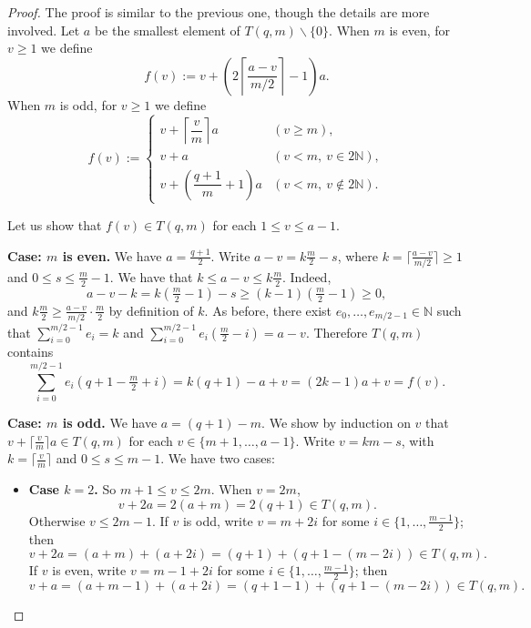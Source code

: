 \documentclass[12pt]{amsart}
\theoremstyle{remark}
\theoremstyle{definition}
\newcommand{\coloneqq}{\mathrel{:=}}
\begin{document}
\begin{proof}
    The proof is similar to the previous one, though the details are more
    involved. Let $a$ be the smallest element of $T(q,m) \smallsetminus \{0\}$.
    When $m$ is even, for $v \ge 1$ we define
    $$f(v) \coloneqq v + \left(2\left\lceil\frac{a-v}{m/2}\right\rceil - 1\right)a.$$
    When $m$ is odd, for $v \ge 1$ we define
    \[
    f(v) \coloneqq \begin{cases}
        v + \left\lceil\dfrac{v}{m}\right\rceil a
            & \left(v \ge m\right), \\[6pt]
        v + a
            & \left(v < m,\ v \in 2\mathbb{N}\right), \\[6pt]
        v + \left(\dfrac{q+1}{m}+1\right)a
            & \left(v < m,\ v \notin 2\mathbb{N}\right).
    \end{cases}
    \]

    Let us show that $f(v) \in T(q,m)$ for each $1 \le v \le a-1$.

    \medskip
    \noindent\textbf{Case: $m$ is even.}
    We have $a = \frac{q+1}{2}$. Write $a - v = k\frac{m}{2} - s$, where
    $k = \lceil\frac{a-v}{m/2}\rceil \ge 1$ and $0 \le s \le \frac{m}{2}-1$.
    We have that $k \le a-v \le k\frac{m}{2}$. Indeed,
    $$a - v - k = k\left(\tfrac{m}{2}-1\right) - s \ge (k-1)\left(\tfrac{m}{2}-1\right) \ge 0,$$
    and $k\frac{m}{2} \ge \frac{a-v}{m/2}\cdot\frac{m}{2}$ by definition of $k$.
    As before, there exist $e_0, \ldots, e_{m/2-1} \in \mathbb{N}$ such that
    $\sum_{i=0}^{m/2-1} e_i = k$ and
    $\sum_{i=0}^{m/2-1} e_i\!\left(\frac{m}{2}-i\right) = a-v$.
    Therefore $T(q,m)$ contains
    $$\sum_{i=0}^{m/2-1} e_i\!\left(q+1-\tfrac{m}{2}+i\right)
      = k(q+1) - a + v = (2k-1)a + v = f(v).$$

    \medskip
    \noindent\textbf{Case: $m$ is odd.}
    We have $a = (q+1)-m$. We show by induction on $v$ that
    $v + \lceil\frac{v}{m}\rceil a \in T(q,m)$ for each
    $v \in \{m+1, \ldots, a-1\}$.
    Write $v = km - s$, with $k = \lceil\frac{v}{m}\rceil$ and $0 \le s \le m-1$.
    We have two cases:

    \begin{itemize}
        \item \textbf{Case $k = 2$.} So $m+1 \le v \le 2m$.
        When $v = 2m$,
        $$v + 2a = 2(a+m) = 2(q+1) \in T(q,m).$$
        Otherwise $v \le 2m-1$.
        If $v$ is odd, write $v = m + 2i$ for some
        $i \in \{1,\ldots,\frac{m-1}{2}\}$; then
        $$v + 2a = (a+m) + (a+2i) = (q+1) + (q+1-(m-2i)) \in T(q,m).$$
        If $v$ is even, write $v = m-1+2i$ for some
        $i \in \{1,\ldots,\frac{m-1}{2}\}$; then
        $$v + a = (a+m-1) + (a+2i) = (q+1-1) + (q+1-(m-2i)) \in T(q,m).$$


\end{itemize}
\end{proof}
\end{document}
